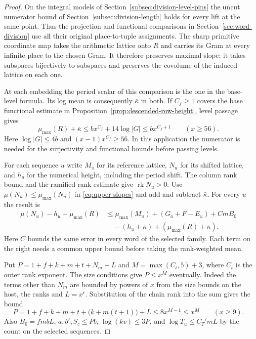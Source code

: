 \begin{proof}
On the integral models of
Section~\ref{subsec:division-level-pins} the uncut numerator
bound of Section~\ref{subsec:division-length} holds for
every lift at the same point. Thus the projection and
functional comparisons in Section~\ref{sec:word-division}
use all their original place-to-tuple assignments. The
sharp primitive coordinate map takes the arithmetic lattice
onto \(R\) and carries its Gram at every infinite place to
the chosen Gram. It therefore preserves maximal slope:
it takes subspaces bijectively to subspaces and preserves
the covolume of the induced lattice on each one.

At each
embedding the period scalar of this comparison is the one
in the base-level formula. Its log mean is consequently
\(\bar\kappa\) in both. If \(C_f\ge1\) covers the base
functional estimate in Proposition~\ref{prop:descended-row-height},
level passage gives
\[
    \mu_{\max}(R)+\bar\kappa
       \le b x^{C_f}+14\log|G|\le b x^{C_f+1}
       \qquad (x\ge56).
\]
Here \(\log|G|\le4b\) and \((x-1)x^{C_f}\ge56\).
In this application the numerator is needed for the
surjectivity and functional bounds before passing
levels. \label{cor:frame-height-limit-1}

For each sequence \(u\) write \(M_u\) for its reference lattice,
\(N_u\) for its shifted lattice, and \(h_u\) for the numerical
height, including the period shift. The column rank bound and the ramified rank estimate give
\(\operatorname{rk}N_u>0\). Use \(\mu(N_u)\le\mu_{\max}(N_u)\)
in \eqref{eq:upper-slopes} and add and subtract \(\bar\kappa\).
For every \(u\) the result is
\[
 \begin{aligned}
 \mu(N_u)-h_u+\mu_{\max}(R)
 &\le \mu_{\max}(M_u)+(G_a+F-E_u)+CmB_0\\
 &\quad -(h_u+\bar\kappa)+(\mu_{\max}(R)+\bar\kappa).
 \end{aligned}
\]
Here \(C\) bounds the same error in every word of the selected
family. Each term on the right needs a common upper bound
before taking the rank-weighted mean.

Put \(P=1+f+k+m+t+N_m+L\) and \(M=\max(C_t,5)+3\),
where \(C_t\) is the outer rank exponent. The size conditions
give \(P\le x^M\) eventually. Indeed the terms other than
\(N_m\) are bounded by powers of \(x\) from the size bounds
on the host, the ranks and \(L=x^\epsilon\). Substitution of the chain rank into the sum gives the bound
\[
 P=1+f+k+m+t+\bigl(k+m(t+1)\bigr)+L\le 8x^{M-1}\le x^M
 \qquad(x\ge9) .
\]
Also \(B_0=fmbL\), \(a,b',S_c\le Pb\),
\(\log(kv)\le3P\), and \(\log T_u\le C_T' mL\)
by the count on the selected sequences.


\end{proof}
